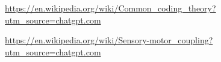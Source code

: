 \documentclass[a4paper]{article}
\title{}
\date{}
\begin{document}
\maketitle
    \url{https://en.wikipedia.org/wiki/Common_coding_theory?utm_source=chatgpt.com}
    
    \url{https://en.wikipedia.org/wiki/Sensory-motor_coupling?utm_source=chatgpt.com}
\end{document}
